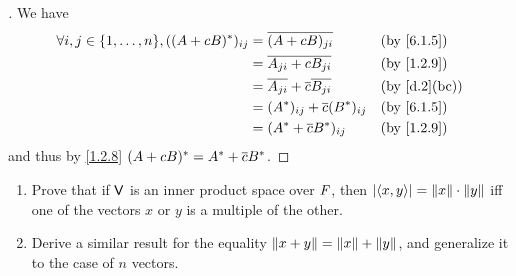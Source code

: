 \begin{proof}[]
	We have
	\begin{align*}
		\forall i, j \in \set{1, \dots, n}, ((A + cB)^*)_{i j} & = \conj{(A + cB)_{j i}}                    &  & \by{6.1.5}   \\
		                                                       & = \conj{A_{j i} + c B_{j i}}               &  & \by{1.2.9}   \\
		                                                       & = \conj{A_{j i}} + \conj{c} \conj{B_{j i}} &  & \by{d.2}[bc] \\
		                                                       & = (A^*)_{i j} + \conj{c} (B^*)_{i j}       &  & \by{6.1.5}   \\
		                                                       & = (A^* + \conj{c} B^*)_{i j}               &  & \by{1.2.9}
	\end{align*}
	and thus by \cref{1.2.8} \((A + cB)^* = A^* + \overline{c} B^*\).
\end{proof}

\begin{ex}\label{ex:6.1.15}
	\begin{enumerate}
		\item Prove that if \(\mathsf{V}\) is an inner product space over \(\mathit{F}\), then \(\left\lvert\left\langle x, y\right\rangle\right\rvert = \left\lVert x\right\rVert \cdot \left\lVert y\right\rVert\) iff one of the vectors \(x\) or \(y\) is a multiple of the other.
		\item Derive a similar result for the equality \(\left\lVert x + y\right\rVert = \left\lVert x\right\rVert + \left\lVert y\right\rVert\), and generalize it to the case of \(n\) vectors.
	\end{enumerate}
\end{ex}

